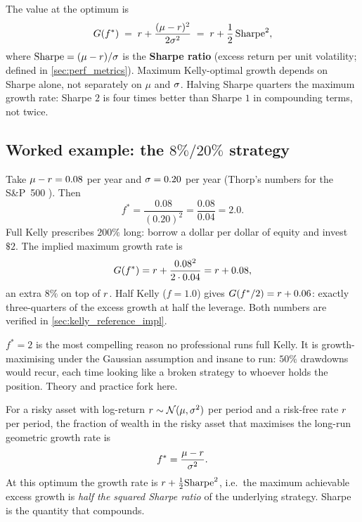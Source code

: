 The value at the optimum is
\begin{equation}
  G(f^{*}) \;=\; r + \frac{(\mu - r)^2}{2\sigma^2}
  \;=\; r + \frac{1}{2}\,\text{Sharpe}^2,
\end{equation}
where $\text{Sharpe} = (\mu - r)/\sigma$ is the
\textbf{Sharpe ratio} (excess return per unit volatility; defined
in \cref{sec:perf_metrics}). Maximum Kelly-optimal growth depends
on Sharpe alone, not separately on $\mu$ and $\sigma$. Halving
Sharpe quarters the maximum growth rate: Sharpe $2$ is four times
better than Sharpe $1$ in compounding terms, not twice.

\subsection{Worked example: the $8\%/20\%$ strategy}
\label{sec:kelly_worked_8_20}

Take $\mu - r = 0.08$ per year and $\sigma = 0.20$ per year
(Thorp's numbers for the S\&P~500 \citeThorp). Then
\begin{equation}
  f^{*} = \frac{0.08}{(0.20)^2} = \frac{0.08}{0.04} = 2.0.
\end{equation}
Full Kelly prescribes $200\%$ long: borrow a dollar per dollar of
equity and invest $\$2$. The implied maximum growth rate is
\begin{equation}
  G(f^{*}) = r + \frac{0.08^2}{2 \cdot 0.04} = r + 0.08,
\end{equation}
an extra $8\%$ on top of $r$. Half Kelly ($f = 1.0$) gives
$G(f^{*}/2) = r + 0.06$: exactly three-quarters of the excess
growth at half the leverage. Both numbers are verified in
\cref{sec:kelly_reference_impl}.

$f^{*} = 2$ is the most compelling reason no professional
runs full Kelly. It is growth-maximising under the Gaussian
assumption and insane to run: $50\%$ drawdowns would recur, each
time looking like a broken strategy to whoever holds the
position. Theory and practice fork here.

\begin{keyfactbox}
For a risky asset with log-return $r \sim \mathcal{N}(\mu, \sigma^2)$
per period and a risk-free rate $r$ per period, the fraction
of wealth in the risky asset that maximises the long-run
geometric growth rate is
\begin{equation*}
  f^{*} = \frac{\mu - r}{\sigma^2}.
\end{equation*}
At this optimum the growth rate is $r + \tfrac12 \text{Sharpe}^2$,
i.e.\ the maximum achievable excess growth is \emph{half the
squared Sharpe ratio} of the underlying strategy. Sharpe is the
quantity that compounds.
\end{keyfactbox}


